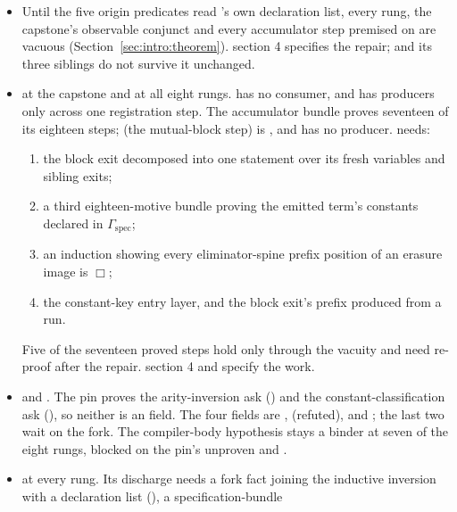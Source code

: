 \begin{itemize}
\item {} \stOpen{} Until the five origin predicates read 's own
declaration list, every rung, the capstone's observable conjunct and every accumulator step premised
on  are vacuous (Section~\ref{sec:intro:theorem}). 
section 4 specifies the repair;  and its three siblings do not survive it
unchanged.
\item {} \stAssumed{} at the capstone and at all eight rungs.
 has no consumer, and  has producers only across one
registration step. The accumulator bundle proves seventeen of its eighteen steps; 
(the mutual-block step) is \stOpen{}, and  has no producer.  needs:
\begin{enumerate}
\item the block exit decomposed into one statement over its fresh variables and sibling exits;
\item a third eighteen-motive bundle proving the emitted term's constants declared in
$\Gamma_{\mathrm{spec}}$;
\item an \Erases{} induction showing every eliminator-spine prefix position of an erasure image is
$\Box$;
\item the constant-key entry layer, and the block exit's prefix produced from a run.
\end{enumerate}
Five of the seventeen proved steps hold only through the vacuity and need re-proof after the repair.
 section 4 and  specify the work.
\item {} \stInherited{} and \stOpen{}. The pin proves the arity-inversion ask
() and the constant-classification ask
(), so neither is an  field. The four fields are
,  (refuted),  and ;
the last two wait on the fork. The compiler-body hypothesis  stays a binder at seven of
the eight rungs, blocked on the pin's unproven  and .
\item {} \stOpen{} at every rung. Its discharge needs a fork fact joining the
inductive inversion with a declaration list (), a specification-bundle

\end{itemize}
